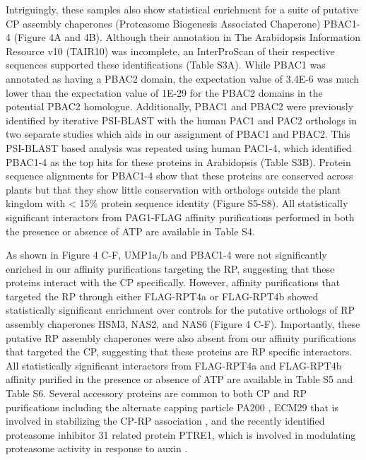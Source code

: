 	Intriguingly, these samples also show statistical enrichment for a suite of putative CP assembly chaperones (Proteasome Biogenesis Associated Chaperone) PBAC1-4 (Figure 4A and 4B). Although their annotation in The Arabidopsis Information Resource v10 (TAIR10) was incomplete, an InterProScan of their respective sequences supported these identifications (Table S3A). While PBAC1 was annotated as having a PBAC2 domain, the expectation value of 3.4E-6 was much lower than the expectation value of 1E-29 for the PBAC2 domains in the potential PBAC2 homologue. Additionally, PBAC1 and PBAC2 were previously identified by iterative PSI-BLAST with the human PAC1 and PAC2 orthologs in two separate studies \citep{kusmierczyk11, le07} which aids in our assignment of PBAC1 and PBAC2. This PSI-BLAST based analysis was repeated using human PAC1-4, which identified PBAC1-4 as the top hits for these proteins in Arabidopsis (Table S3B). Protein sequence alignments for PBAC1-4 show that these proteins are conserved across plants but that they show little conservation with orthologs outside the plant kingdom with < 15\% protein sequence identity (Figure S5-S8).  All statistically significant interactors from PAG1-FLAG affinity purifications performed in both the presence or absence of ATP are available in Table S4.

	As shown in Figure 4 C-F, UMP1a/b and PBAC1-4 were not significantly enriched in our affinity purifications targeting the RP, suggesting that these proteins interact with the CP specifically. However, affinity purifications that targeted the RP through either FLAG-RPT4a or FLAG-RPT4b showed statistically significant enrichment over controls for the putative orthologs of RP assembly chaperones HSM3, NAS2, and NAS6 (Figure 4 C-F). Importantly, these putative RP assembly chaperones were also absent from our affinity purifications that targeted the CP, suggesting that these proteins are RP specific interactors. All statistically significant interactors from FLAG-RPT4a and FLAG-RPT4b affinity purified in the presence or absence of ATP are available in Table S5 and Table S6. Several accessory proteins are common to both CP and RP purifications including the alternate capping particle PA200 \citep{book10}, ECM29 that is involved in stabilizing the CP-RP association \citep{lehmann10}, and the recently identified proteasome inhibitor 31 related protein PTRE1, which is involved in modulating proteasome activity in response to auxin \citep{yang16}. 

